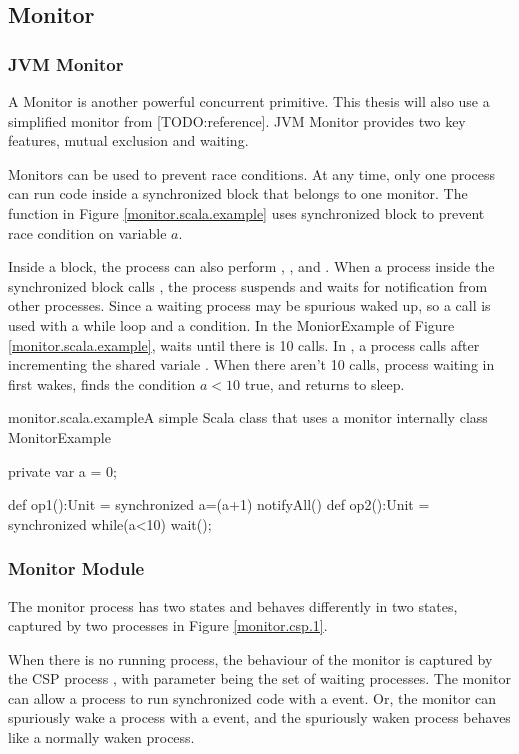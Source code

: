 \documentclass{article}
\begin{document}
\subsection{Monitor}
\subsubsection{JVM Monitor}
A Monitor is another powerful concurrent primitive. This thesis will also use a simplified monitor from [TODO:reference]. JVM Monitor provides two key features, mutual exclusion and waiting. 

Monitors can be used to prevent race conditions. At any time, only one process can run code inside a synchronized block that belongs to one monitor. The function  in Figure \ref{monitor.scala.example} uses synchronized block to prevent race condition on variable $a$. 

Inside a  block, the process can also perform , , and . When a process inside the synchronized block calls , the process suspends and waits for notification from other processes. Since a waiting process may be spurious waked up, so a  call is used with a while loop and a condition. In the MoniorExample of Figure \ref{monitor.scala.example},  waits until there is 10  calls. In , a process calls  after incrementing the shared variale . When there aren't 10  calls, process waiting in  first wakes, finds the condition $a<10$ true, and returns to sleep. 


\begin{scalainline}{monitor.scala.example}{A simple Scala class that uses a monitor internally}
class MonitorExample {
  private var a = 0;

  def op1():Unit = synchronized{ 
    a=(a+1)%
    notifyAll()
  }
  def op2():Unit = synchronized{ 
    while(a<10) wait();
  }
}
\end{scalainline}
  
\subsubsection{Monitor Module}
The monitor process has two states and behaves differently in two states, captured by two processes in Figure \ref{monitor.csp.1}.

When there is no running process, the behaviour of the monitor is captured by the CSP process , with parameter  being the set of waiting processes. The monitor can allow a process to run synchronized code with a  event. Or, the monitor can spuriously wake a process with a  event, and the spuriously waken process behaves like a normally waken process.
\end{document}
